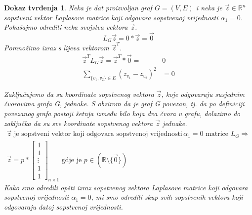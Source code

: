 \documentclass[11pt]{article}
\newtheorem*{custom_proof}{Dokaz tvrđenja}
\begin{document}
	\begin{custom_proof}
	Neka je dat proizvoljan graf $G=(V,E)$ i neka je $\vec{z} \in \mathbb{R}^n$ sopstveni vektor Laplasove matrice koji odgovara sopstvenoj vrijednosti $\alpha_1 = 0$.
	Pokušajmo odrediti neka svojstva vektora $\vec{z}$.
	\[
		L_G\vec{z} = 0 * \vec{z} = \vec{0}
	\]
	Pomnožimo izraz s lijeva vektorom $\vec{z}^T$.
	\[
		\begin{split}
			\vec{z}^T L_G \vec{z} = \vec{z}^T * \vec{0} = &0 \\
			\sum_{\{v_1,v_2\} \in E} (z_{v_1} - z_{v_2})^2 &= 0
		\end{split}
	\]
	
	Zaključujemo da su koordinate sopstvenog vektora $\vec{z}$, koje odgovaraju susjednim čvorovima grafa G, jednake.
	S obzirom da je graf G povezan, tj. da po definiciji povezanog grafa postoji šetnja između bilo koja dva čvora u grafu,
	dolazimo do zaključka da su sve koordinate sopstvenog vektora $\vec{z}$ jednake. 
	\[
	\begin{split}
	 \vec{z} \text{ je sopstveni vektor koji odgovara sopstvenoj vrijednosti } & \alpha_1 = 0 \text{ matrice }  L_G \Rightarrow \\
	 \vec{z} =p *
	\begin{bmatrix} 
	1 \\ 1 \\ \vdots \\ 1 \\ 1
	\end{bmatrix}_{n \times 1}
	\text{ gdje je } p \in (\mathbb{R} \setminus \{\vec{0}\})
	\end{split}
	\]
	Kako smo odredili opšti izraz sopstvenog vektora Laplasove matrice koji odgovara sopstvenoj vrijednosti $\alpha_1 = 0$,
	mi smo odredili skup svih sopstvenih vektora koji odgovaraju datoj sopstvenoj vrijednosti.
	

\end{custom_proof}
\end{document}
